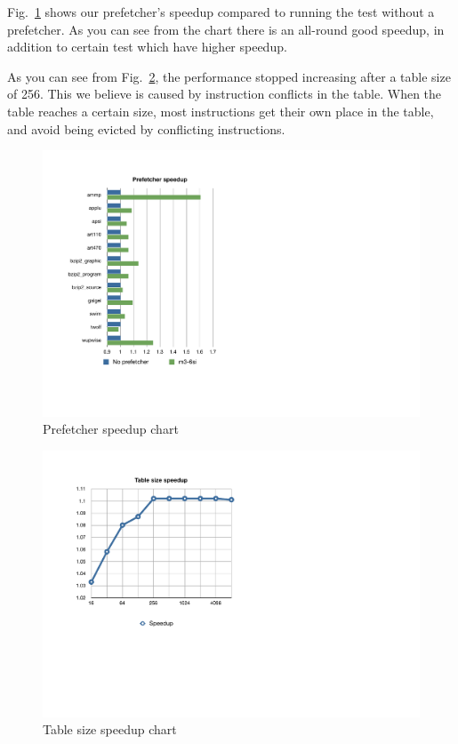 Fig.~\ref{fig:prefetcher_speedup} shows our prefetcher's speedup compared to running the test without a prefetcher. As you can see from the chart there is an all-round good speedup, in addition to certain test which have higher speedup.

As you can see from Fig.~\ref{fig:table_size_chart}, the performance stopped increasing after a table size of 256. This we believe is caused by instruction conflicts in the table. When the table reaches a certain size, most instructions get their own place in the table, and avoid being evicted by conflicting instructions.

\begin{figure}
	\centering \includegraphics[scale=0.7]{img/prefetcher_chart.pdf}
	\caption{Prefetcher speedup chart}
	\label{fig:prefetcher_speedup}
\end{figure}

\begin{figure}
	\centering \includegraphics[scale=0.7]{img/table_size_chart.pdf}
	\caption{Table size speedup chart}
	\label{fig:table_size_chart}
\end{figure}
